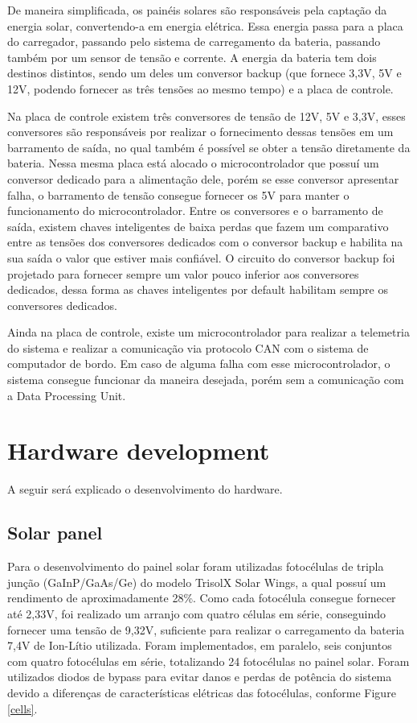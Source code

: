 \documentclass[final,3p,times,twocolumn,authoryear]{elsarticle}
\begin{document}
	De maneira simplificada, os painéis solares são responsáveis pela captação da energia solar, convertendo-a em energia elétrica. Essa energia passa para a placa do carregador, passando pelo sistema de carregamento da bateria, passando também por um sensor de tensão e corrente. A energia da bateria tem dois destinos distintos, sendo um deles um conversor backup (que fornece 3,3V, 5V e 12V, podendo fornecer as três tensões ao mesmo tempo) e a placa de controle. 
	
	Na placa de controle existem três conversores de tensão de 12V, 5V e 3,3V, esses conversores são responsáveis por realizar o fornecimento dessas tensões em um barramento de saída, no qual também é possível se obter a tensão diretamente da bateria. Nessa mesma placa está alocado o microcontrolador que possuí um conversor dedicado para a alimentação dele, porém se esse conversor apresentar falha, o barramento de tensão consegue fornecer os 5V para manter o funcionamento do microcontrolador. Entre os conversores e o barramento de saída, existem chaves inteligentes de baixa perdas que fazem um comparativo entre as tensões dos conversores dedicados com o conversor backup e habilita na sua saída o valor que estiver mais confiável. O circuito do conversor backup foi projetado para fornecer sempre um valor pouco inferior aos conversores dedicados, dessa forma as chaves inteligentes por default habilitam sempre os conversores dedicados.
	
	Ainda na placa de controle, existe um microcontrolador para realizar a telemetria do sistema e realizar a comunicação via protocolo CAN com o sistema de computador de bordo. Em caso de alguma falha com esse microcontrolador, o sistema consegue funcionar da maneira desejada, porém sem a  comunicação com a Data Processing Unit.
	
\section{Hardware development}
\label{Hardware development}	

	A seguir será explicado o desenvolvimento do hardware.

\subsection{Solar panel}
\label{Solar panel}

	Para o desenvolvimento do painel solar foram utilizadas fotocélulas de tripla junção (GaInP/GaAs/Ge) do modelo TrisolX Solar Wings, a qual possuí um rendimento de aproximadamente 28\%. Como cada fotocélula consegue fornecer até 2,33V, foi realizado um arranjo com quatro células em série, conseguindo fornecer uma tensão de 9,32V, suficiente para realizar o carregamento da bateria 7,4V de Ion-Lítio utilizada. Foram implementados, em paralelo, seis conjuntos com quatro fotocélulas em série, totalizando 24 fotocélulas no painel solar. Foram utilizados diodos de bypass para evitar danos e perdas de potência do sistema devido a diferenças de características elétricas das fotocélulas, conforme Figure \ref{cells}.
	
\end{document}
